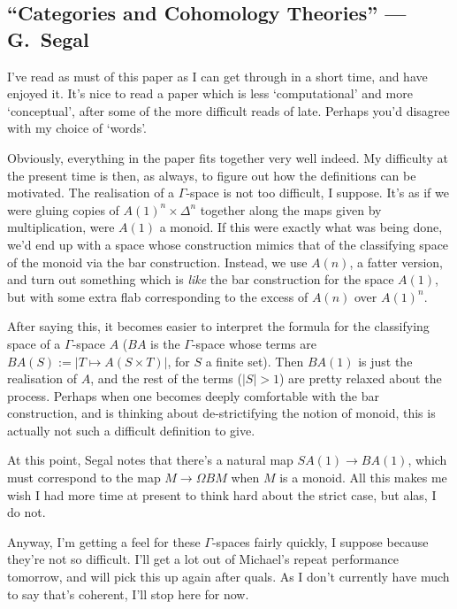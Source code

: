 \documentclass[11pt]{article}
\newcommand{\KanSemResponse}[1]
{
\thispagestyle{fancy}
\section{#1}
}
\begin{document}
\begin{SegalCategories AndCohomologyTheories}
\KanSemResponse
{``Categories and Cohomology Theories'' --- G.\ Segal}
I've read as must of this paper as I can get through in a short time, and have enjoyed it. It's nice to read a paper which is less `computational' and more `conceptual', after some of the more difficult reads of late. Perhaps you'd disagree with my choice of `words'.

Obviously, everything in the paper fits together very well indeed. My difficulty at the present time is then, as always, to figure out how the definitions can be motivated. The realisation of a $\Gamma$-space is not too difficult, I suppose. It's as if we were gluing copies of $A(1)^n\times \Delta^n$ together along the maps given by multiplication, were $A(1)$ a monoid. If this were exactly what was being done, we'd end up with a space whose construction mimics that of the classifying space of the monoid via the bar construction. Instead, we use $A(n)$, a fatter version, and turn out something which is \emph{like} the bar construction for the space $A(1)$, but with some extra flab corresponding to the excess of $A(n)$ over $A(1)^n$.

After saying this, it becomes easier to interpret the formula for the classifying space of a $\Gamma$-space $A$ ($BA$ is the $\Gamma$-space whose terms are $BA(S):=|T\mapsto A(S\times T)|$, for $S$ a finite set). Then $BA(1)$ is just the realisation of $A$, and the rest of the terms ($|S|>1$) are pretty relaxed about the process. Perhaps when one becomes deeply comfortable with the bar construction, and is thinking about de-strictifying the notion of monoid, this is actually not such a difficult definition to give.

At this point, Segal notes that there's a natural map $SA(1)\to BA(1)$, which must correspond to the map $M\to\Omega BM$ when $M$ is a monoid. All this makes me wish I had more time at present to think hard about the strict case, but alas, I do not.

Anyway, I'm getting a feel for these $\Gamma$-spaces fairly quickly, I suppose because they're not so difficult. I'll get a lot out of Michael's repeat performance tomorrow, and will pick this up again after quals. As I don't currently have much to say that's coherent, I'll stop here for now.



\pagebreak
\end{SegalCategories AndCohomologyTheories}
\end{document}
